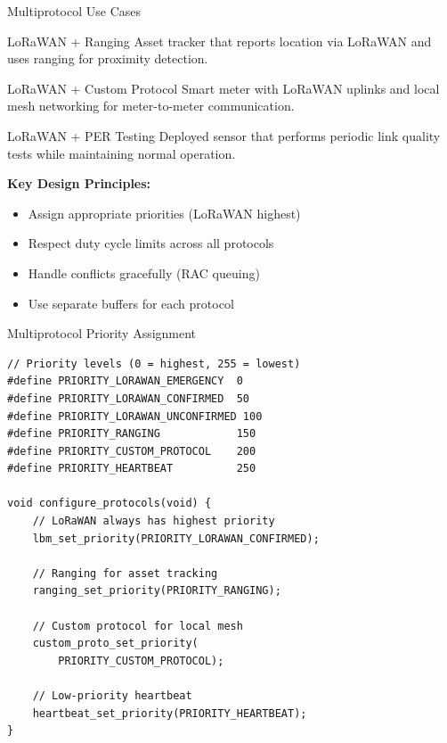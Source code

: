 \documentclass{beamer}
\begin{document}
\begin{frame}{Multiprotocol Use Cases}
\begin{block}{LoRaWAN + Ranging}
Asset tracker that reports location via LoRaWAN and uses ranging for proximity detection.
\end{block}

\begin{block}{LoRaWAN + Custom Protocol}
Smart meter with LoRaWAN uplinks and local mesh networking for meter-to-meter communication.
\end{block}

\begin{block}{LoRaWAN + PER Testing}
Deployed sensor that performs periodic link quality tests while maintaining normal operation.
\end{block}

\vspace{0.3cm}

\textbf{Key Design Principles:}
\begin{itemize}
    \item Assign appropriate priorities (LoRaWAN highest)
    \item Respect duty cycle limits across all protocols
    \item Handle conflicts gracefully (RAC queuing)
    \item Use separate buffers for each protocol
\end{itemize}
\end{frame}

\begin{frame}[fragile]{Multiprotocol Priority Assignment}
\begin{lstlisting}[caption={Priority Configuration}]
// Priority levels (0 = highest, 255 = lowest)
#define PRIORITY_LORAWAN_EMERGENCY  0
#define PRIORITY_LORAWAN_CONFIRMED  50
#define PRIORITY_LORAWAN_UNCONFIRMED 100
#define PRIORITY_RANGING            150
#define PRIORITY_CUSTOM_PROTOCOL    200
#define PRIORITY_HEARTBEAT          250

void configure_protocols(void) {
    // LoRaWAN always has highest priority
    lbm_set_priority(PRIORITY_LORAWAN_CONFIRMED);

    // Ranging for asset tracking
    ranging_set_priority(PRIORITY_RANGING);

    // Custom protocol for local mesh
    custom_proto_set_priority(
        PRIORITY_CUSTOM_PROTOCOL);

    // Low-priority heartbeat
    heartbeat_set_priority(PRIORITY_HEARTBEAT);
}
\end{lstlisting}
\end{frame}
\end{document}
